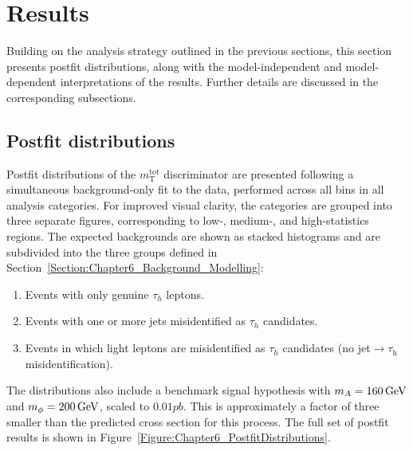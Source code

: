 \section{Results}

Building on the analysis strategy outlined in the previous sections, this section presents postfit distributions, along with the model-independent and model-dependent interpretations of the results. Further details are discussed in the corresponding subsections.

\subsection{Postfit distributions}
\label{sec:postfit_distributions}

Postfit distributions of the $m_\mathrm{T}^\mathrm{tot}$ discriminator are presented following a simultaneous background-only fit to the data, performed across all bins in all analysis categories. For improved visual clarity, the categories are grouped into three separate figures, corresponding to low-, medium-, and high-statistics regions. The expected backgrounds are shown as stacked histograms and are subdivided into the three groups defined in Section~\ref{Section:Chapter6_Background_Modelling}:

\begin{enumerate}
    \item Events with only genuine $\tau_{h}$ leptons.
    \item Events with one or more jets misidentified as $\tau_{h}$ candidates.
    \item Events in which light leptons are misidentified as $\tau_{h}$ candidates (no jet$\to\tau_\mathrm{h}$ misidentification).
\end{enumerate}

The distributions also include a benchmark signal hypothesis with $m_A = 160\,\text{Ge\hspace{-.08em}V}$ and $m_\phi = 200\,\text{Ge\hspace{-.08em}V}$, scaled to $0.01\unit{pb}$. This is approximately a factor of three smaller than the predicted cross section for this process. The full set of postfit results is shown in Figure~\ref{Figure:Chapter6_PostfitDistributions}.


